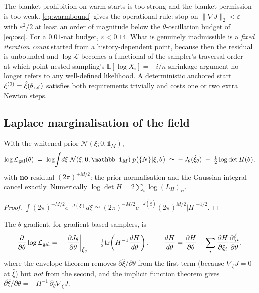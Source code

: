 \begin{remark}
The blanket prohibition on warm starts is too strong and the blanket permission
is too weak.  \eqref{eq:warmbound} gives the operational rule: stop on
$\|\nabla J\|_2<\varepsilon$ with $\varepsilon^2/2$ at least an order of
magnitude below the $\theta$-oscillation budget of \eqref{eq:osc}.  For a
$0.01$-nat budget, $\varepsilon<0.14$.  What is genuinely inadmissible is a
\emph{fixed iteration count} started from a history-dependent point, because
then the residual is unbounded and $\log\mathcal L$ becomes a functional of the
sampler's traversal order --- at which point nested sampling's
$\mathbb E[\log X_i]=-i/n$ shrinkage argument no longer refers to any
well-defined likelihood.  A deterministic anchored start
$\xi^{(0)}=\hat\xi(\theta_{\rm ref})$ satisfies both requirements trivially and
costs one or two extra Newton steps.
\end{remark}

\subsection{Laplace marginalisation of the field}

\begin{proposition}
\label{prop:laplace}
With the whitened prior $\mathcal N(\xi;0,\mathbb 1_M)$,
\begin{equation}
  \log\mathcal L_{\rm gal}(\theta)
  \;=\;\log\!\int\!d\xi\;\mathcal N(\xi;0,\mathbb 1_M)\;p\big(\{N\}|\xi,\theta\big)
  \;\simeq\;-\,J_\theta(\hat\xi_\theta)\;-\;\tfrac12\log\det H(\theta),
  \label{eq:laplace}
\end{equation}
with \textbf{no} residual $(2\pi)^{\pm M/2}$: the prior normalisation and the
Gaussian integral cancel exactly.  Numerically
$\log\det H=2\sum_i\log (L_H)_{ii}$.
\end{proposition}
\begin{proof}
$\int(2\pi)^{-M/2}e^{-J(\xi)}d\xi\simeq(2\pi)^{-M/2}e^{-J(\hat\xi)}(2\pi)^{M/2}|H|^{-1/2}$.
\end{proof}

The $\theta$-gradient, for gradient-based samplers, is
\begin{equation}
  \frac{\partial}{\partial\theta}\log\mathcal L_{\rm gal}
  =-\left.\frac{\partial J_\theta}{\partial\theta}\right|_{\hat\xi_\theta}
  \;-\;\tfrac12\mathrm{tr}\!\left(H^{-1}\frac{dH}{d\theta}\right),
  \qquad
  \frac{dH}{d\theta}=\frac{\partial H}{\partial\theta}
  +\sum_i\frac{\partial H}{\partial\xi_i}\frac{\partial\hat\xi_i}{\partial\theta},
  \label{eq:laplacegrad}
\end{equation}
where the envelope theorem removes $\partial\hat\xi/\partial\theta$ from the
first term (because $\nabla_\xi J=0$ at $\hat\xi$) but \emph{not} from the
second, and the implicit function theorem gives
$\partial\hat\xi/\partial\theta=-H^{-1}\,\partial_\theta\nabla_\xi J$.

